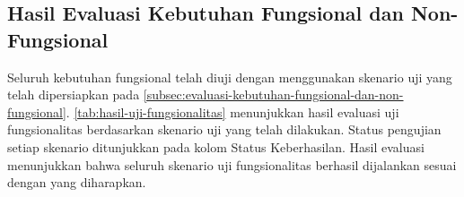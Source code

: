 \subsection{Hasil Evaluasi Kebutuhan Fungsional dan Non-Fungsional}
\label{subsec:hasil-evaluasi-kebutuhan-fungsional-dan-non-fungsional}

Seluruh kebutuhan fungsional telah diuji dengan menggunakan skenario uji yang telah dipersiapkan pada \autoref{subsec:evaluasi-kebutuhan-fungsional-dan-non-fungsional}. \autoref{tab:hasil-uji-fungsionalitas} menunjukkan hasil evaluasi uji fungsionalitas berdasarkan skenario uji yang telah dilakukan. Status pengujian setiap skenario ditunjukkan pada kolom Status Keberhasilan. Hasil evaluasi menunjukkan bahwa seluruh skenario uji fungsionalitas berhasil dijalankan sesuai dengan yang diharapkan.

